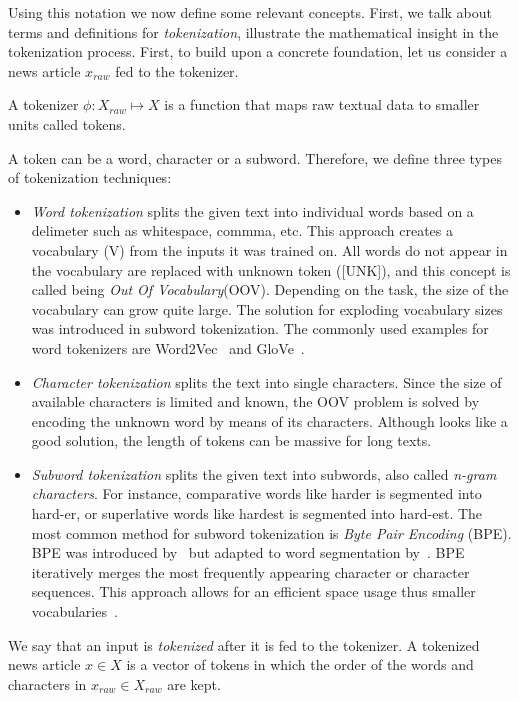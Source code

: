 Using this notation we now define some relevant concepts. First, we talk about terms and definitions for \emph{tokenization}, illustrate the mathematical insight in the tokenization process. First, to build upon a concrete foundation, let us consider a news article $x_{raw}$ fed to the tokenizer.
\begin{definition}[Tokenizer]
    A tokenizer $\phi:X_{raw} \mapsto X$ is a function that maps raw textual data to smaller units called tokens.
\end{definition}
A token can be a word, character or a subword. Therefore, we define three types of tokenization techniques:
\begin{itemize}
    \item \emph{Word tokenization} splits the given text into individual words based on a delimeter such as whitespace, commma, etc. This approach creates a vocabulary (V) from the inputs it was trained on. All words do not appear in the vocabulary are replaced with unknown token ([UNK]), and this concept is called being \emph{Out Of Vocabulary}(OOV). Depending on the task, the size of the vocabulary can grow quite large. The solution for exploding vocabulary sizes was introduced in subword tokenization. The commonly used examples for word tokenizers are Word2Vec~\parencite{Word2Vec_Mikolov} and GloVe~\parencite{GloVe_Pennington}.
    \item \emph{Character tokenization} splits the text into single characters. Since the size of available characters is limited and known, the OOV problem is solved by encoding the unknown word by means of its characters. Although looks like a good solution, the length of tokens can be massive for long texts.
    \item \emph{Subword tokenization} splits the given text into subwords, also called \emph{n-gram characters}. For instance, comparative words like harder is segmented into hard-er, or superlative words like hardest is segmented into hard-est. The most common method for subword tokenization is \emph{Byte Pair Encoding} (BPE). BPE was introduced by~\cite{ANewAlgorithmForDataCompression_Gage} but adapted to word segmentation by~\cite{NeuralMachineTranslationOfRareWords_Sennrich}. BPE iteratively merges the most frequently appearing character or character sequences. This approach allows for an efficient space usage thus smaller vocabularies~\parencite{NeuralMachineTranslationOfRareWords_Sennrich}.
\end{itemize}
We say that an input is \emph{tokenized} after it is fed to the tokenizer. A tokenized news article $x \in X$ is a vector of tokens in which the order of the words and characters in $x_{raw} \in X_{raw}$ are kept.
